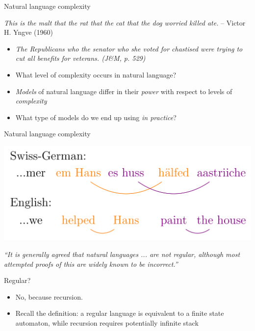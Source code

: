 \documentclass{beamer}
\begin{document}
\begin{frame}{Natural language complexity}

{\it This is the malt that the rat that the cat that the dog worried killed ate.} -- Victor H. Yngve (1960)
\vfill

\begin{itemize}
\item {\it The Republicans who the senator who she voted for chastised were trying to cut all benefits for veterans. (J\&M, p. 529)}
\item What level of complexity occurs in natural language?
\item \textit{Models} of natural language differ in their \textit{power} with respect to levels of \textit{complexity}
\item What type of models do we end up using {\it in practice}?
\end{itemize}
\end{frame}


\begin{frame}{Natural language complexity}

\includegraphics[width=.8\textwidth]{figures/swiss}

{\small \it ``It is generally agreed that natural languages ... are
  not regular, although most attempted proofs of this are widely known
  to be incorrect.''}

\small
Regular? 
\begin{itemize}
\item No, because recursion.
\item Recall the definition: a regular language is equivalent to a
  finite state automaton, while recursion requires potentially
  infinite stack
\end{itemize}
\end{frame}
\end{document}

